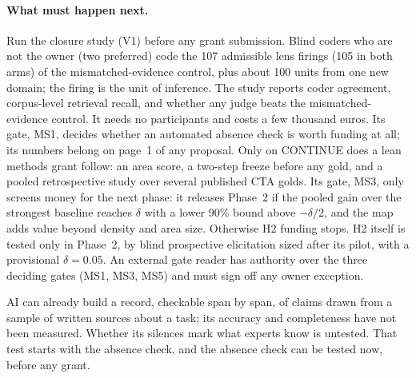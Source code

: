 \paragraph{What must happen next.} \evfut{} Run the closure study (V1) before any grant submission. Blind
coders who are not the owner (two preferred) code the 107 admissible lens firings (105 in both arms) of the
mismatched-evidence control, plus about 100 units from one new domain; the firing is the unit of
inference. The study reports coder agreement, corpus-level retrieval recall, and whether any
judge beats the mismatched-evidence control. It needs no participants and costs a few thousand euros. Its gate, MS1,
decides whether an automated absence check is worth funding at all; its numbers belong on page~1 of
any proposal. Only on CONTINUE does a lean methods grant follow: an area score, a two-step freeze
before any gold, and a pooled retrospective study over several published CTA golds. Its gate, MS3,
only screens money for the next phase: it releases Phase~2 if the pooled gain over the strongest
baseline reaches $\delta$ with a lower 90\% bound above $-\delta/2$, and the map adds value beyond
density and area size. Otherwise H2 funding stops. H2 itself is tested only in Phase~2, by blind
prospective elicitation sized after its pilot, with a provisional $\delta = 0.05$. An external gate reader has authority over
the three deciding gates (MS1, MS3, MS5) and must sign off any owner exception.

\begin{findingbox}[unbreakable]
  AI can already build a record, checkable span by span, of claims drawn from a sample of written sources about a task; its accuracy and completeness have not been measured. Whether
  its silences mark what experts know is untested. That test starts with the absence check, and the
  absence check can be tested now, before any grant.
\end{findingbox}
